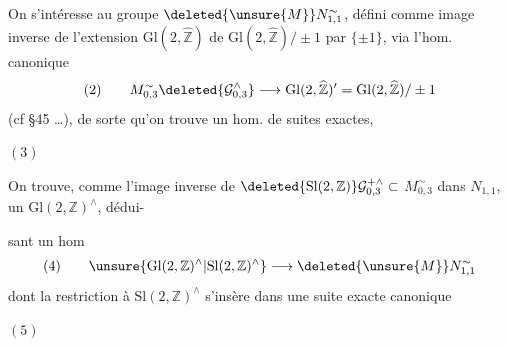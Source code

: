 On s'intéresse au groupe $\deleted{\unsure{M}}N_{1,1}^{\sim}$, défini  comme image inverse de l'extension $\mathrm{Gl}(2,\widehat{\mathbb Z})$ de $\mathrm{Gl}(2,\widehat{\mathbb Z})/\pm1$ par $\{\pm1\}$, via l'hom. canonique
\[
(2)\qquad
M_{0,3}^{\sim}\deleted{\mathcal G_{0,3}^{\wedge}}
\longrightarrow\mathrm{Gl}(2,\widehat{\mathbb Z})'
=\mathrm{Gl}(2,\widehat{\mathbb Z})/\pm1
\]
(cf \S45 \ldots), de sorte qu'on trouve un hom. de suites exactes,


$(3)$

On trouve,   comme l'image inverse de $\deleted{\mathrm{Sl}(2,\mathbb Z)}\mathcal G_{0,3}^{+\wedge}\subset$  $M_{0,3}^{\sim}$ dans $N_{1,1}$, un $\mathrm{Gl}(2,\mathbb Z)^\wedge$, dédui-



sant un hom
\[
(4)\qquad
\unsure{\mathrm{Gl}(2,\mathbb Z)^\wedge|\mathrm{Sl}(2,\mathbb Z)^\wedge}
\longrightarrow\deleted{\unsure{M}}N_{1,1}^{\sim}
\]
dont la restriction à $\mathrm{Sl}(2,\mathbb Z)^\wedge$ s'insère  dans une suite exacte canonique

$(5)$

